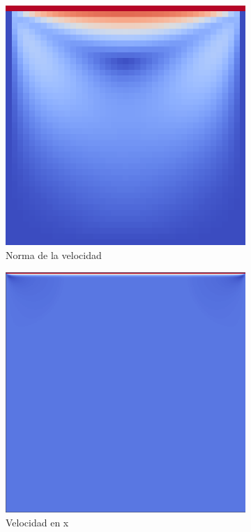 \begin{figure}[!htbp]
\centering
\begin{subfigure}{.3\textwidth}
  \centering
  \includegraphics[width=.8\linewidth]{imagenes/small_norm.png}
  \caption{Norma de la velocidad}
  \label{fig:sub1}
\end{subfigure}%
\begin{subfigure}{.3\textwidth}
  \centering
  \includegraphics[width=.8\linewidth]{imagenes/u.png}
  \caption{Velocidad en x}
  \label{fig:sub2}
\end{subfigure}
\begin{subfigure}{.3\textwidth}

\end{subfigure}
\end{figure}
